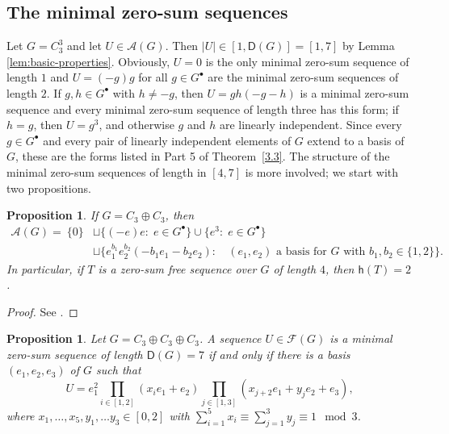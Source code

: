 \documentclass[a4paper, 10pt]{amsart}
\theoremstyle{plain}
\newtheorem{proposition}[theorem]{\bf Proposition}
\theoremstyle{definition}
\theoremstyle{definition}
\numberwithin{equation}{section}
\begin{document}
\subsection{The minimal zero-sum sequences}\label{sec:atoms}

Let $G=C_3^3$ and let $U \in \mathcal A (G)$. Then $|U| \in [1, \mathsf D (G)] = [1,7]$ by Lemma \ref{lem:basic-properties}. Obviously, $U = 0$ is the only minimal zero-sum sequence of length $1$ and $U = (-g)g$ for all $g \in G^{\bullet}$ are the minimal zero-sum sequences of length $2$. If $g, h \in G^{\bullet}$ with $h \ne -g$, then $U = g h (-g-h)$ is a minimal zero-sum sequence and every minimal zero-sum sequence of length three has this form; if $h = g$, then $U = g^3$, and otherwise $g$ and $h$ are linearly independent. Since every $g \in G^{\bullet}$ and every pair of linearly independent elements of $G$ extend to a basis of $G$, these are the forms listed in Part 5 of Theorem~\ref{3.3}. The structure of the minimal zero-sum sequences of length in $[4,7]$ is more involved; we start with two propositions.


\smallskip
\begin{proposition} \label{3.1}
If  $G = C_3 \oplus C_3$, then
\[
\begin{aligned}
\mathcal A (G)  = \ \{0\} & \sqcup  \{ (- e) e :\; e \in G^{\bullet} \} \cup \{ e^3 :\; e \in G^{\bullet} \} \\
                          & \sqcup \bigl\{ e_1^{b_1}  e_2^{b_2}  (-b_1e_1 - b_2 e_2)  :\;\mbox{ $(e_1, e_2)$ a basis for  $G$ with  $b_1, b_2 \in \{1,2\}$} \bigr\}.
\end{aligned}
\]
In particular, if $T$ is a zero-sum free sequence over $G$ of length $4$, then $\mathsf h(T)=2$.
\end{proposition}

\begin{proof}
See \cite[Corollary 4.5.10]{Ge-Gr-Zh26a}.
\end{proof}


\smallskip
\begin{proposition} \label{3.2}
Let $G = C_3 \oplus C_3 \oplus C_3$.  A sequence  $U \in \mathcal F (G)$ is a minimal zero-sum sequence of length $\mathsf D (G)=7$ if and only if
there is a basis $(e_1,e_2,e_3)$ of $G$ such that
\[
U=e_1^2 \prod_{i\in [1,2]}(x_ie_1+e_2)\prod_{j\in [1,3]}(x_{j+2}e_1 + y_je_2 +  e_3) ,
\]
where $x_1,\ldots,x_5,y_1,\ldots y_3 \in [0,2]$ with $\sum_{i=1}^5x_i\equiv
  \sum_{j=1}^3y_j \equiv 1 \mod{3}$.
\end{proposition}
\end{document}
